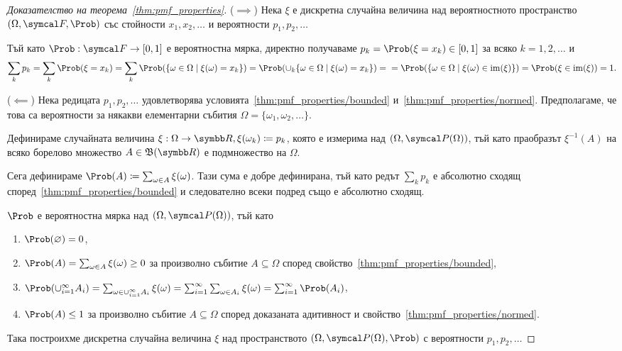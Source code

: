 \documentclass[numbers=endperiod, bibliography=totocnumbered]{scrartcl}
\begin{document}
\begin{proof}[Доказателство на теорема~\ref{thm:pmf_properties}]
  (\( \implies \)) Нека \( \xi \) е дискретна случайна величина над вероятностното пространство \( (\Omega, \F, \Prob) \) със стойности \( x_1, x_2, \ldots \) и вероятности \( p_1, p_2, \ldots \)

  Тъй като \( \Prob: \F \to [0, 1] \) е вероятностна мярка, директно получаваме \( p_k = \Prob(\xi = x_k) \in [0, 1] \) за всяко \( k = 1, 2, \ldots \) и
  \begin{equation*}
    \sum_k p_k
    =
    \sum_k \Prob(\xi = x_k)
    =
    \sum_k \Prob(\{ \omega \in \Omega \mid \xi(\omega) = x_k \})
    =
    \Prob(\cup_k \{ \omega \in \Omega \mid \xi(\omega) = x_k \})
    = \\ =
    \Prob(\{ \omega \in \Omega \mid \xi(\omega) \in \Image(\xi) \})
    =
    \Prob(\xi \in \Image(\xi))
    =
    1.
  \end{equation*}

  (\( \impliedby \)) Нека редицата \( p_1, p_2, \ldots \) удовлетворява условията~\ref{thm:pmf_properties/bounded} и~\ref{thm:pmf_properties/normed}. Предполагаме, че това са вероятности за някакви елементарни събития \( \Omega = \{ \omega_1, \omega_2, \ldots \} \).

  Дефинираме случайната величина \( \xi: \Omega \to \R, \xi(\omega_k) \coloneqq p_k \), която е измерима над \( (\Omega, \PowerSet(\Omega)) \), тъй като праобразът \( \xi^{-1}(A) \) на всяко борелово множество \( A \in \BorelAlgebra(\R) \) е подмножество на \( \Omega \).

  Сега дефинираме \( \Prob(A) \coloneqq \sum_{\omega \in A} \xi(\omega) \). Тази сума е добре дефинирана, тъй като редът \( \sum_k p_k \) е абсолютно сходящ според~\ref{thm:pmf_properties/bounded} и следователно всеки подред също е абсолютно сходящ.

  \( \Prob \) е вероятностна мярка над \( (\Omega, \PowerSet(\Omega)) \), тъй като
  \begin{enumerate}
    \item \( \Prob(\varnothing) = 0 \),
    \item \( \Prob(A) = \sum_{\omega \in A} \xi(\omega) \geq 0 \) за произволно събитие \( A \subseteq \Omega \) според свойство~\ref{thm:pmf_properties/bounded},
    \item \( \Prob(\cup_{i=1}^\infty A_i) = \sum_{\omega \in \cup_{i=1}^\infty A_i} \xi(\omega) = \sum_{i=1}^\infty \sum_{\omega \in A_i} \xi(\omega) = \sum_{i=1}^\infty \Prob(A_i) \),
    \item \( \Prob(A) \leq 1 \) за произволно събитие \( A \subseteq \Omega \) според доказаната адитивност и свойство~\ref{thm:pmf_properties/normed}.
  \end{enumerate}
  Така построихме дискретна случайна величина \( \xi \) над пространството \( (\Omega, \PowerSet(\Omega), \Prob) \) с вероятности \( p_1, p_2, \ldots \)
\end{proof}
\end{document}
